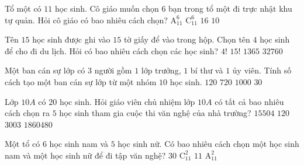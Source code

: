 

\begin{ex}%
	Tổ một có $11$ học sinh. Cô giáo muốn chọn $6$ bạn trong tổ một đi trực nhật khu tự quản. Hỏi cô giáo có bao nhiêu  cách chọn?
	\choice 
		 {$\mathrm{A}_{11}^{6}$}
		{\True $\mathrm{C}_{11}^{6}$} 
		 {$16$}
		{$10$} 
\end{ex}

\begin{ex}%
	Tên $15$ học sinh được ghi vào $15$ tờ giấy để vào trong hộp. Chọn tên $4$ học sinh để cho đi du lịch. Hỏi có bao nhiêu cách chọn các  học sinh?
	\choice 
		{$4!$} 
		 {$15!$}
		 {\True $1365$}
		 {$32760$}
\end{ex}

\begin{ex}%
	Một ban cán sự lớp có $3$ người  gồm $1$ lớp trưởng, $1$ bí thư và $1$ ủy viên. Tính số cách tạo một ban cán sự lớp từ một nhóm $10$ học sinh.
	 \choice
		 {$120$}
		 {\True $720$}
		{$1000$} 
		{$30$} 
\end{ex}

\begin{ex}%
	Lớp $10A$ có $20$ học sinh. Hỏi giáo viên chủ nhiệm lớp $10A$ có tất cả  bao nhiêu cách chọn ra $5$ học sinh tham gia cuộc thi văn nghệ của nhà trường?
	\choice 
		{\True $15504$} 
		 {$120$}
		 {$3003$}
		{$1860480$} 
\end{ex}

\begin{ex}%
	Một tổ có $6$ học sinh nam và $5$ học sinh nữ. Có bao nhiêu cách chọn một học sinh nam và một  học sinh nữ để đi tập văn nghệ?
	 \choice
		{\True  $30$}
		 {$\mathrm{C}_{11}^2$}
		{$11$} 
		{$\mathrm{A}_{11}^2$} 
\end{ex}

